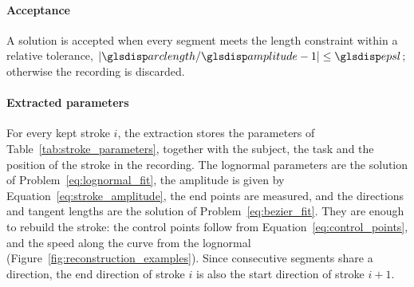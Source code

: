 \documentclass[12pt]{report}
\begin{document}
\paragraph{Acceptance}
A solution is accepted when every segment meets the length constraint within a relative tolerance, $\lvert \sym{arclength}_i/\sym{amplitude}_i-1\rvert\le\sym{epsl}$; otherwise the recording is discarded.

\paragraph{Extracted parameters}
For every kept stroke $i$, the extraction stores the parameters of Table~\ref{tab:stroke_parameters}, together with the subject, the task and the position of the stroke in the recording. The lognormal parameters are the solution of Problem~\eqref{eq:lognormal_fit}, the amplitude is given by Equation~\eqref{eq:stroke_amplitude}, the end points are measured, and the directions and tangent lengths are the solution of Problem~\eqref{eq:bezier_fit}. They are enough to rebuild the stroke: the control points follow from Equation~\eqref{eq:control_points}, and the speed along the curve from the lognormal (Figure~\ref{fig:reconstruction_examples}). Since consecutive segments share a direction, the end direction of stroke $i$ is also the start direction of stroke $i+1$.
\end{document}
